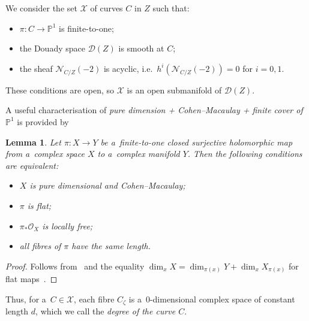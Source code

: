 \documentclass[11pt]{article}
\numberwithin{equation}{section}
\newtheorem{Lemma}[Theorem]{Lemma}
\begin{document}
We consider the set ${\mathcal{X}}$ of curves $C$ in $Z$ such that:
\begin{itemize}\itemsep=0pt
\item
$\pi:C\to {\mathbb{P}}^1$ is f\/inite-to-one;
\item
the Douady space ${\mathcal{D}}(Z)$ is smooth at $C$;
\item
the sheaf ${\mathcal{N}}_{C/Z}(-2)$ is acyclic, i.e.\
$h^i({\mathcal{N}}_{C/Z}(-2))=0$ for $i=0,1$.
\end{itemize}
These conditions are open, so ${\mathcal{X}}$ is an open submanifold of ${\mathcal{D}}(Z)$.

A useful characterisation of {\em pure dimension + Cohen--Macaulay + finite cover of ${\mathbb{P}}^1$} is provided by

\begin{Lemma}\label{CM}
Let $\pi:X\to Y$ be a~finite-to-one closed surjective holomorphic map from a~complex space $X$ to a~complex manifold
$Y$.
Then the following conditions are equivalent:
\begin{itemize}\itemsep=0pt
\item[$(i)$] $X$ is pure dimensional and Cohen--Macaulay;
\item[$(ii)$] $\pi$ is flat;
\item[$(iii)$] $\pi_\ast{\mathcal{O}}_X$ is locally free;
\item[$(iv)$] all fibres of $\pi$ have the same length.
\end{itemize}
\end{Lemma}

\begin{proof}
Follows from~\cite[Corollary 18.17]{Eis1} and the equality $\dim_xX=\dim_{\pi(x)}Y+\dim_{x} X_{\pi(x)}$ for f\/lat
maps~\cite[Proposition II.2.11]{GR}.
\end{proof}

Thus, for a~$C\in {\mathcal{X}}$, each f\/ibre $C_\zeta$ is a~$0$-dimensional complex space of constant length $d$, which
we call the {\em degree of the curve $C$}.
\end{document}
